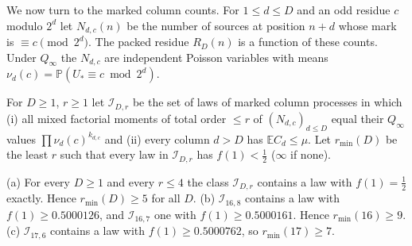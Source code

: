 \documentclass[11pt]{article}
\renewcommand{\Pr}{\mathbb P}
\newcommand{\Ex}{\mathbb E}
\newcommand{\Qinf}{{Q_\infty}}
\begin{document}
We now turn to the marked column counts. For $1\le d\le D$ and an odd residue $c$ modulo $2^d$ let $N_{d,c}(n)$ be the number of sources at position $n+d$ whose mark is $\equiv c\pmod{2^d}$. The packed residue $R_D(n)$ is a function of these counts. Under $\Qinf$ the $N_{d,c}$ are independent Poisson variables with means $\nu_d(c)=\Pr(U_*\equiv c\bmod2^d)$.

\begin{definition}
For $D\ge1$, $r\ge1$ let $\mathcal I_{D,r}$ be the set of laws of marked column processes in which (i) all mixed factorial moments of total order $\le r$ of $(N_{d,c})_{d\le D}$ equal their $\Qinf$ values $\prod\nu_d(c)^{k_{d,c}}$ and (ii) every column $d>D$ has $\Ex C_d\le\mu$. Let $r_{\min}(D)$ be the least $r$ such that every law in $\mathcal I_{D,r}$ has $f(1)<\tfrac12$ ($\infty$ if none).
\end{definition}

\begin{theorem}\label{thm:order}
(a) For every $D\ge1$ and every $r\le4$ the class $\mathcal I_{D,r}$ contains a law with $f(1)=\tfrac12$ exactly. Hence $r_{\min}(D)\ge5$ for all $D$. (b) $\mathcal I_{16,8}$ contains a law with $f(1)\ge0.5000126$, and $\mathcal I_{16,7}$ one with $f(1)\ge0.5000161$. Hence $r_{\min}(16)\ge9$. (c) $\mathcal I_{17,6}$ contains a law with $f(1)\ge0.5000762$, so $r_{\min}(17)\ge7$.
\end{theorem}
\end{document}
